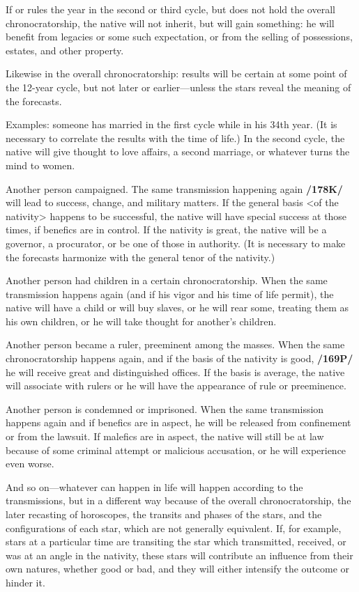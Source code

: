 If \Saturn\xspace or \Jupiter\xspace rules the year in the second or third cycle, but does not hold the overall chronocratorship, the native will not inherit, but will gain something: he will benefit from legacies or some such expectation, or from the selling of possessions, estates, and other property. 

Likewise in the overall chronocratorship: results will be certain at some point of the 12-year cycle, but not later or earlier—unless the stars reveal the meaning of the forecasts.

Examples: someone has married in the first cycle while in his 34th year. (It is necessary to correlate the results with the time of life.) In the second cycle, the native will give thought to love affairs, a second marriage, or whatever turns the mind to women.

Another person campaigned. The same transmission happening again \textbf{/178K/} will lead to success, change, and military matters. If the general basis <of the nativity> happens to be successful, the native will have special success at those times, if benefics are in control. If the nativity is great, the native will be a governor, a procurator, or be one of those in authority. (It is necessary to make the forecasts harmonize with the general tenor of the nativity.)

Another person had children in a certain chronocratorship. When the same transmission happens again (and if his vigor and his time of life permit), the native will have a child or will buy slaves, or he will rear some, treating them as his own children, or he will take thought for another’s children.

Another person became a ruler, preeminent among the masses. When the same chronocratorship happens again, and if the basis of the nativity is good, \textbf{/169P/} he will receive great and distinguished offices. If the basis is average, the native will associate with rulers or he will have the appearance of rule or preeminence.

Another person is condemned or imprisoned. When the same transmission happens again and if benefics are in aspect, he will be released from confinement or from the lawsuit. If malefics are in aspect, the native will still be at law because of some criminal attempt or malicious accusation, or he will experience even worse.

And so on—whatever can happen in life will happen according to the transmissions, but in a different way because of the overall chronocratorship, the later recasting of horoscopes, the transits and phases of the stars, and the configurations of each star, which are not generally equivalent. If, for example, stars at a particular time are transiting the star which transmitted, received, or was at an angle in the nativity, these stars will contribute an influence from their own natures, whether good or bad, and they will either intensify the outcome or hinder it. 

